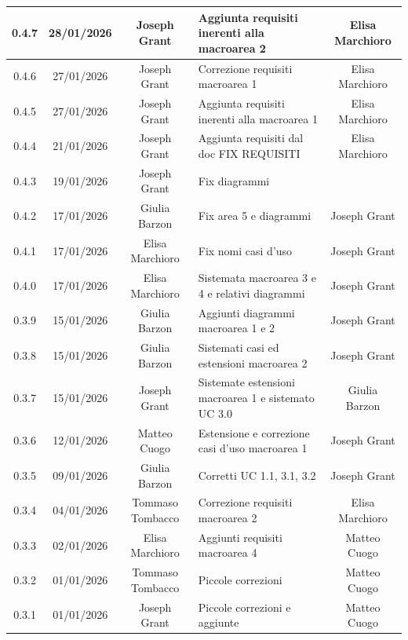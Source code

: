 \documentclass[11pt,a4paper]{article}
\begin{document}
\begin{longtable}[H]{|c|c|c|>{\raggedright\arraybackslash}p{}|c|}
        \hline
        0.4.7 & 28/01/2026 & Joseph Grant & Aggiunta requisiti inerenti alla macroarea 2 & Elisa Marchioro\\
        \hline
        0.4.6 & 27/01/2026 & Joseph Grant & Correzione requisiti macroarea 1 & Elisa Marchioro\\
        \hline
        0.4.5 & 27/01/2026 & Joseph Grant & Aggiunta requisiti inerenti alla macroarea 1 & Elisa Marchioro\\
        \hline
        0.4.4 & 21/01/2026 & Joseph Grant & Aggiunta requisiti dal doc FIX REQUISITI & Elisa Marchioro \\
        \hline
        0.4.3 & 19/01/2026 & Joseph Grant & Fix diagrammi &  \\
        \hline
        0.4.2 & 17/01/2026 & Giulia Barzon & Fix area 5 e diagrammi & Joseph Grant \\
        \hline
        0.4.1 & 17/01/2026 & Elisa Marchioro & Fix nomi casi d'uso & Joseph Grant \\
        \hline
        0.4.0 & 17/01/2026 & Elisa Marchioro & Sistemata macroarea 3 e 4 e relativi diagrammi & Joseph Grant \\
        \hline
        0.3.9 & 15/01/2026 & Giulia Barzon & Aggiunti diagrammi macroarea 1 e 2 & Joseph Grant \\
        \hline
        0.3.8 & 15/01/2026 & Giulia Barzon & Sistemati casi ed estensioni macroarea 2 & Joseph Grant \\
        \hline
        0.3.7 & 15/01/2026 & Joseph Grant & Sistemate estensioni macroarea 1 e sistemato UC 3.0 & Giulia Barzon\\
        \hline
        0.3.6 & 12/01/2026 & Matteo Cuogo & Estensione e correzione casi d'uso macroarea 1 & Joseph Grant\\
        \hline
        0.3.5 & 09/01/2026 & Giulia Barzon & Corretti UC 1.1, 3.1, 3.2 & Joseph Grant\\
        \hline
        0.3.4 & 04/01/2026 & Tommaso Tombacco & Correzione requisiti macroarea 2 & Elisa Marchioro\\
        \hline
        0.3.3 & 02/01/2026 & Elisa Marchioro & Aggiunti requisiti macroarea 4 &  Matteo Cuogo\\
        \hline
        0.3.2 & 01/01/2026 & Tommaso Tombacco & Piccole correzioni & Matteo Cuogo\\
        \hline
        0.3.1 & 01/01/2026 & Joseph Grant & Piccole correzioni e aggiunte &  Matteo Cuogo\\
        \hline

\end{longtable}
\end{document}

